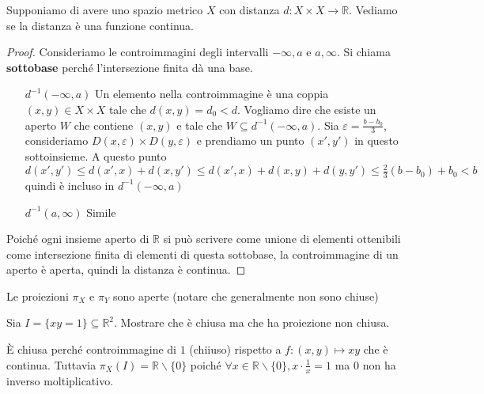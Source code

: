 \begin{proposition}
    Supponiamo di avere uno spazio metrico \(X\) con distanza \(d: X\times X \to
    \mathbb{R}\). Vediamo se la distanza è una funzione continua.
\end{proposition}
\begin{proof}
    Consideriamo le controimmagini degli intervalli \(-\infty, a\) e \(a,
    \infty\). Si chiama \textbf{sottobase} perché l'intersezione finita dà una
    base.
\begin{itemize}[label = --]
    \item[\(d^{-1}(-\infty, a)\)] Un elemento nella controimmagine è una coppia
        \((x, y) \in X\times X\)  tale che \(d(x,y) = d_{0} < d\). Vogliamo dire
        che esiste un aperto \(W\) che contiene \((x,y)\) e tale che \(W
        \subseteq d^{-1}(-\infty,a) \). Sia \(\varepsilon = \frac{b-b_{0}}{3}\),
        consideriamo \(D(x, \varepsilon) \times D(y, \varepsilon)\) e prendiamo
        un punto \((x', y')\) in questo sottoinsieme. A questo punto \(d(x',
        y')\le d(x', x) + d(x, y') \le d(x',x) + d(x,y)+d(y,y') \le
        \frac{2}{3}(b-b_{0}) + b_{0} < b\) quindi è incluso in
        \(d^{-1}(-\infty,a)\) 
    \item[\(d^{-1}(a, \infty)\) ] Simile
\end{itemize}
    Poiché ogni insieme aperto di \(\mathbb{R}\) si può scrivere come
    unione di elementi ottenibili come intersezione finita di elementi di questa
    sottobase, la controimmagine di un aperto è aperta, quindi la distanza è
    continua.
\end{proof}

\begin{proposition}
    Le proiezioni \(\pi_X\) e \(\pi_Y\) sono aperte (notare che generalmente non
    sono chiuse) 
\end{proposition}
\begin{example}
    Sia \(I = \{xy=1\} \subseteq \mathbb{R}^2\). Mostrare che è chiusa ma che ha
    proiezione non chiusa.

    È chiusa perché controimmagine di \(1\) (chiiuso) rispetto a \(f: (x, y) \mapsto xy\)
    che è continua. Tuttavia \(\pi_X(I) = \mathbb{R} \smallsetminus \{0\} \)
    poiché \(\forall x \in \mathbb{R} \smallsetminus \{0\}, x \cdot \frac{1}{x}
    = 1\) ma 0 non ha inverso moltiplicativo.
\end{example}

